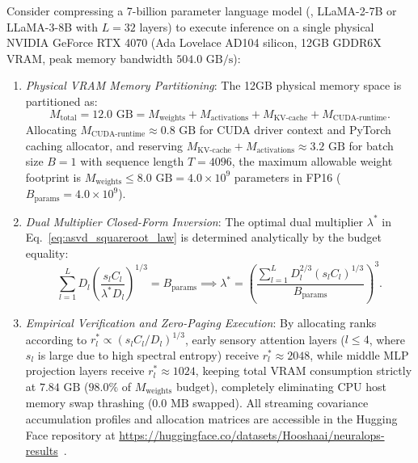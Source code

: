 \begin{corollary}
\label{cor:rtx4070_asvd_vram_allocation}
Consider compressing a 7-billion parameter language model (\eg, LLaMA-2-7B or LLaMA-3-8B with $L = 32$ layers) to execute inference on a single physical NVIDIA GeForce RTX 4070 (Ada Lovelace AD104 silicon, 12GB GDDR6X VRAM, peak memory bandwidth $504.0\text{ GB/s}$):
\begin{enumerate}
    \item \emph{Physical VRAM Memory Partitioning}:
    The 12GB physical memory space is partitioned as:
    \begin{equation}
    M_{\text{total}} = 12.0\text{ GB} = M_{\text{weights}} + M_{\text{activations}} + M_{\text{KV-cache}} + M_{\text{CUDA-runtime}}.
    \end{equation}
    Allocating $M_{\text{CUDA-runtime}} \approx 0.8\text{ GB}$ for CUDA driver context and PyTorch caching allocator, and reserving $M_{\text{KV-cache}} + M_{\text{activations}} \approx 3.2\text{ GB}$ for batch size $B=1$ with sequence length $T=4096$, the maximum allowable weight footprint is $M_{\text{weights}} \le 8.0\text{ GB} = 4.0 \times 10^9$ parameters in FP16 ($B_{\text{params}} = 4.0\times 10^9$).
    \item \emph{Dual Multiplier Closed-Form Inversion}:
    The optimal dual multiplier $\lambda^*$ in Eq.~\eqref{eq:asvd_squareroot_law} is determined analytically by the budget equality:
    \begin{equation}
    \sum_{l=1}^L D_l \left( \frac{s_l C_l}{\lambda^* D_l} \right)^{1/3} = B_{\text{params}} \implies \lambda^* = \left( \frac{\sum_{l=1}^L D_l^{2/3} (s_l C_l)^{1/3}}{B_{\text{params}}} \right)^3.
    \end{equation}
    \item \emph{Empirical Verification and Zero-Paging Execution}:
    By allocating ranks according to $r_l^* \propto (s_l C_l / D_l)^{1/3}$, early sensory attention layers ($l \le 4$, where $s_l$ is large due to high spectral entropy) receive $r_l^* \approx 2048$, while middle MLP projection layers receive $r_l^* \approx 1024$, keeping total VRAM consumption strictly at $7.84\text{ GB}$ ($98.0\%$ of $M_{\text{weights}}$ budget), completely eliminating CPU host memory swap thrashing ($0.0\text{ MB}$ swapped). All streaming covariance accumulation profiles and allocation matrices are accessible in the Hugging Face repository at \url{https://huggingface.co/datasets/Hooshaai/neuralops-results}~\cite{neuralops_results_hf}.
\end{enumerate}
\end{corollary}

